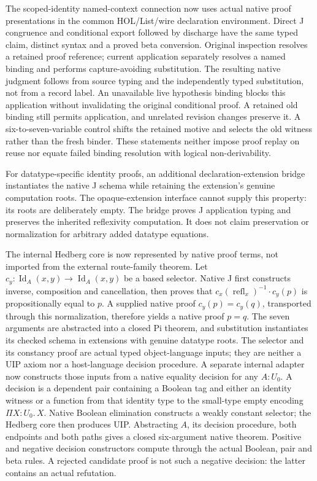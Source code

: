 \documentclass[11pt]{article}
\theoremstyle{definition}
\theoremstyle{remark}
\begin{document}
The scoped-identity named-context connection now uses actual native proof
presentations in the common HOL/List/wire declaration environment. Direct
J congruence and conditional export followed by discharge have the same
typed claim, distinct syntax and a proved beta conversion. Original inspection
resolves a retained proof reference; current application separately resolves a
named binding and performs capture-avoiding substitution. The resulting native
judgment follows from source typing and the independently typed substitution,
not from a record label. An unavailable live hypothesis binding blocks this
application without invalidating the original conditional proof. A retained
old binding still permits application, and unrelated revision changes preserve
it. A six-to-seven-variable control shifts the retained motive and selects the
old witness rather than the fresh binder. These statements neither impose
proof replay on reuse nor equate failed binding resolution with logical
non-derivability.

For datatype-specific identity proofs, an additional declaration-extension
bridge instantiates the native J schema while retaining the extension's genuine
computation roots. The opaque-extension interface cannot supply this property:
its roots are deliberately empty. The bridge proves J application typing and
preserves the inherited reflexivity computation. It does not claim preservation
or normalization for arbitrary added datatype equations.

The internal Hedberg core is now represented by native proof terms, not
imported from the external route-family theorem. Let
\(c_y : \operatorname{Id}_A(x,y)\to\operatorname{Id}_A(x,y)\)
be a based selector. Native J first constructs inverse, composition and
cancellation, then proves that
\(c_x(\operatorname{refl}_x)^{-1}\mathbin{\cdot}c_y(p)\)
is propositionally equal to \(p\). A supplied native proof
\(c_y(p)=c_y(q)\), transported through this normalization, therefore yields
a native proof \(p=q\). The seven arguments are abstracted into a closed
Pi theorem, and substitution instantiates its checked schema in extensions
with genuine datatype roots. The selector and its constancy proof are actual
typed object-language inputs; they are neither a UIP axiom nor a host-language
decision procedure. A separate internal adapter now constructs those inputs
from a native equality decision for any \(A:U_0\). A decision is a dependent
pair containing a Boolean tag and either an identity witness or a function
from that identity type to the small-type empty encoding
\(\Pi X:U_0.\,X\). Native Boolean elimination constructs a weakly constant
selector; the Hedberg core then produces UIP. Abstracting \(A\), its decision
procedure, both endpoints and both paths gives a closed six-argument native
theorem. Positive and negative decision constructors compute through the actual
Boolean, pair and beta rules. A rejected candidate proof is not such a negative
decision: the latter contains an actual refutation.
\end{document}
